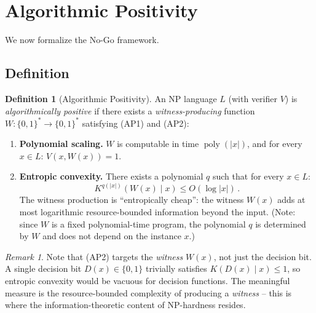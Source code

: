 \documentclass[aps,prd,twocolumn,superscriptaddress,nofootinbib]{revtex4-2}
\theoremstyle{definition}
\newtheorem{definition}[theorem]{Definition}
\theoremstyle{remark}
\newtheorem{remark}[theorem]{Remark}
\DeclareMathOperator{\poly}{poly}
\begin{document}
\section{Algorithmic Positivity}
\label{sec:positivity}

We now formalize the No-Go framework.

\subsection{Definition}

\begin{definition}[Algorithmic Positivity]
\label{def:alg_pos}
An NP language $L$ (with verifier $V$) is \textit{algorithmically positive} if there exists a \textit{witness-producing} function $W: \{0,1\}^* \to \{0,1\}^*$ satisfying (AP1) and (AP2):

\begin{enumerate}
\item[\textbf{(AP1)}] \textbf{Polynomial scaling.} $W$ is computable in time $\poly(|x|)$, and for every $x \in L$: $V(x, W(x)) = 1$.

\item[\textbf{(AP2)}] \textbf{Entropic convexity.} There exists a polynomial $q$ such that for every $x \in L$:
\begin{equation}
K^{q(|x|)}(W(x) \mid x) \leq O(\log|x|)\,.
\end{equation}
The witness production is ``entropically cheap'': the witness $W(x)$ adds at most logarithmic resource-bounded information beyond the input. (Note: since $W$ is a fixed polynomial-time program, the polynomial $q$ is determined by $W$ and does not depend on the instance $x$.)
\end{enumerate}
\end{definition}

\begin{remark}
Note that (AP2) targets the \textit{witness} $W(x)$, not just the decision bit. A single decision bit $D(x) \in \{0,1\}$ trivially satisfies $K(D(x) \mid x) \leq 1$, so entropic convexity would be vacuous for decision functions. The meaningful measure is the resource-bounded complexity of producing a \textit{witness} -- this is where the information-theoretic content of NP-hardness resides.
\end{remark}
\end{document}
